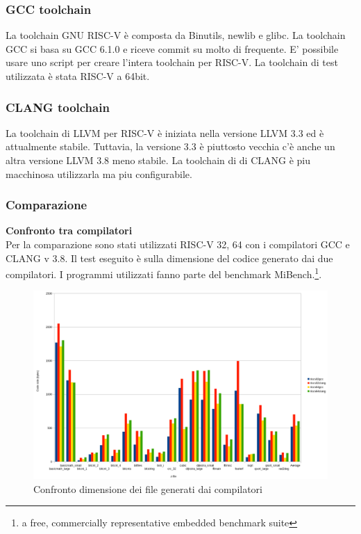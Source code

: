 \documentclass[12pt,a4paper]{report}
\begin{document}
\subsubsection{GCC toolchain}
La toolchain GNU RISC-V è composta da Binutils, newlib e glibc. La toolchain GCC si basa su GCC 6.1.0 e riceve commit su molto di frequente.  E' possibile usare uno script per creare l'intera toolchain per RISC-V. 
La toolchain di test utilizzata è stata RISC-V a 64bit.

\subsubsection{CLANG toolchain}
La toolchain di LLVM per RISC-V è iniziata nella versione LLVM 3.3 ed è attualmente stabile. Tuttavia, la versione 3.3 è piuttosto vecchia c'è anche un altra versione LLVM 3.8 meno stabile. La toolchain di di CLANG è piu macchinosa utilizzarla ma piu configurabile.  

\subsubsection{Comparazione}
\textbf{Confronto tra compilatori}\\

Per la comparazione sono stati utilizzati RISC-V 32, 64 con i compilatori GCC e CLANG v 3.8. Il test eseguito è sulla dimensione del codice generato dai due compilatori. I programmi utilizzati fanno parte del benchmark MiBench.\footnote{a free, commercially representative embedded benchmark suite}.

\begin{figure}[h!]
	\centering
	\includegraphics[scale = 0.3]{CompilatoriGrafici/Compilatori_GCC_CLANG.png}
	\caption{Confronto dimensione dei file generati dai compilatori}
	\label{Fig:graficoSizeComparisionCompilatori}
\end{figure}
\end{document}
